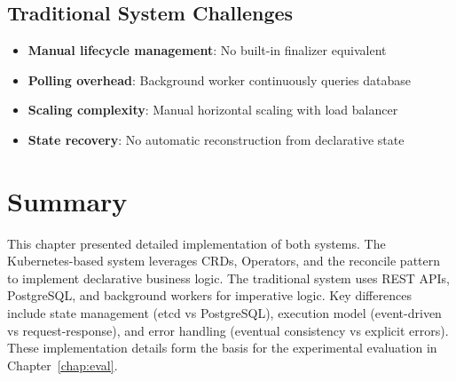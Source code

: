 \subsection{Traditional System Challenges}

\begin{itemize}
    \item \textbf{Manual lifecycle management}: No built-in finalizer equivalent
    \item \textbf{Polling overhead}: Background worker continuously queries database
    \item \textbf{Scaling complexity}: Manual horizontal scaling with load balancer
    \item \textbf{State recovery}: No automatic reconstruction from declarative state
\end{itemize}

\section{Summary}

This chapter presented detailed implementation of both systems. The Kubernetes-based system leverages CRDs, Operators, and the reconcile pattern to implement declarative business logic. The traditional system uses REST APIs, PostgreSQL, and background workers for imperative logic. Key differences include state management (etcd vs PostgreSQL), execution model (event-driven vs request-response), and error handling (eventual consistency vs explicit errors). These implementation details form the basis for the experimental evaluation in Chapter~\ref{chap:eval}.
